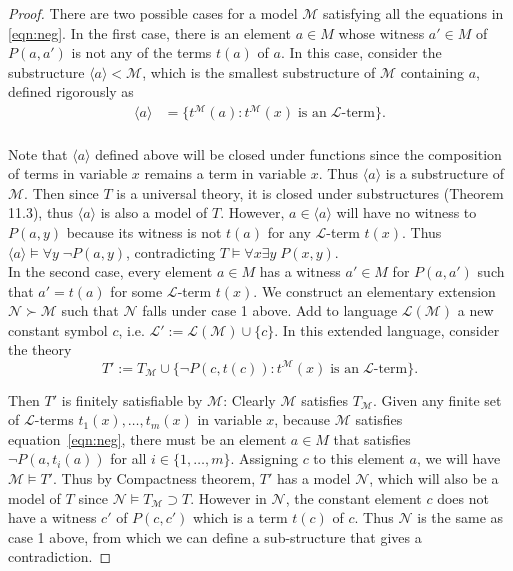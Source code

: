\documentclass{article}
\begin{document}
\begin{enumerate}[label={\bf Q\arabic*:}]
\begin{proof}
      There are two possible cases for a model $\mathcal{M}$ satisfying all
      the equations in \eqref{eqn:neg}. In the first case, there is an
      element $a\in M$ whose witness $a'\in M$ of $P(a,a')$ is not any of the
      terms $t(a)$ of $a$. In this case, consider the substructure $\langle
      a\rangle<\mathcal{M}$, which is the smallest substructure of
      $\mathcal{M}$ containing $a$, defined rigorously as
      \begin{align*}
        \langle a\rangle &=\{t^\mathcal{M}(a):
          t^\mathcal{M}(x)\; \text{is an}\; \mathcal{L}\text{-term}\}. \\
      \end{align*}

      Note that $\langle a\rangle$ defined above will be closed under
      functions since the composition of terms in variable $x$ remains a
      term in variable $x$. Thus $\langle a\rangle$ is a substructure of
      $\mathcal{M}$. Then since $T$ is a universal theory, it is closed
      under substructures (Theorem 11.3), thus $\langle a\rangle$ is also a
      model of $T$. However, $a\in\langle a\rangle$ will have no witness to
      $P(a,y)$ because its witness is not $t(a)$ for any $\mathcal{L}$-term
      $t(x)$. Thus $\langle a\rangle\models\forall y\; \neg P(a,y)$,
      contradicting $T\models\forall x\exists y\; P(x,y)$. \\

      In the second case, every element $a\in M$ has a witness $a'\in M$
      for $P(a,a')$ such that $a'=t(a)$ for some $\mathcal{L}$-term $t(x)$.
      We construct an elementary extension $\mathcal{N}\succ\mathcal{M}$
      such that $\mathcal{N}$ falls under case 1 above. Add to language
      $\mathcal{L}(\mathcal{M})$ a new constant symbol $c$, i.e.
      $\mathcal{L}':=\mathcal{L}(\mathcal{M})\cup\{c\}$. In this extended
      language, consider the theory
      \[T':=T_\mathcal{M}\cup \{\neg P(c,t(c)):t^\mathcal{M}(x)\;
        \text{is an}\; \mathcal{L}\text{-term}\}.\]

      Then $T'$ is finitely satisfiable by $\mathcal{M}$: Clearly
      $\mathcal{M}$ satisfies $T_\mathcal{M}$. Given any finite set of
      $\mathcal{L}$-terms $t_1(x),\ldots,t_m(x)$ in variable $x$, because
      $\mathcal{M}$ satisfies equation~\eqref{eqn:neg}, there must be an
      element $a\in M$ that satisfies $\neg P(a,t_i(a))$ for all
      $i\in\{1,\ldots,m\}$. Assigning $c$ to this element $a$, we will have
      $\mathcal{M}\models T'$. Thus by Compactness theorem, $T'$
      has a model $\mathcal{N}$, which will also be a model of $T$ since
      $\mathcal{N}\models T_\mathcal{M}\supset T$. However in
      $\mathcal{N}$, the constant element $c$ does not have a witness $c'$
      of $P(c,c')$ which is a term $t(c)$ of $c$. Thus $\mathcal{N}$ is the
      same as case 1 above, from which we can define a sub-structure that
      gives a contradiction.
    \end{proof}
\end{enumerate}
\end{document}
